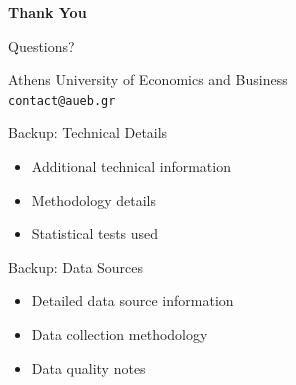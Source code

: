 \documentclass[aspectratio=169]{beamer}
\begin{document}
\begin{frame}[plain]
    \begin{center}
        \vspace{2cm}
        {\Huge \textcolor{AUEBMaroon}{\textbf{Thank You}}}

        \vspace{1cm}
        {\Large Questions?}

        \vspace{2cm}
        \textcolor{AUEBGray}{
            Athens University of Economics and Business\\
            \texttt{contact@aueb.gr}
        }
    \end{center}
\end{frame}

\appendix

\begin{frame}{Backup: Technical Details}
    \begin{itemize}
        \item Additional technical information
        \item Methodology details
        \item Statistical tests used
    \end{itemize}
\end{frame}

\begin{frame}{Backup: Data Sources}
    \begin{itemize}
        \item Detailed data source information
        \item Data collection methodology
        \item Data quality notes
    \end{itemize}
\end{frame}
\end{document}

